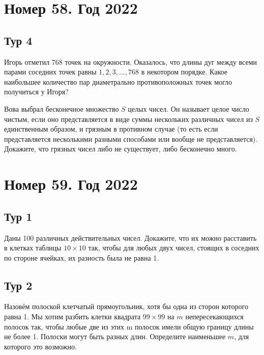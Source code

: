\documentclass[11pt, a4paper]{problems_template}
\begin{document}
\chapter{Номер 58. Год 2022}

\section{Тур 4}

\begin{exercise}
Игорь отметил 768 точек на окружности. Оказалось, что длины дуг между
всеми парами соседних точек равны $1, 2, 3, \dots, 768$ в некотором порядке. Какое наибольшее количество пар диаметрально противоположных точек могло получиться у Игоря?
\end{exercise}

\begin{exercise}
Вова выбрал бесконечное множество $S$ целых чисел. Он называет целое число чистым, если оно представляется в виде суммы нескольких различных чисел из $S$ единственным образом, и грязным в противном случае (то есть если представляется несколькими разными способами или вообще не представляется). Докажите, что грязных чисел либо не существует, либо бесконечно много.
\end{exercise}


\chapter{Номер 59. Год 2022}

\section{Тур 1}

\begin{exercise}
Даны 100 различных действительных чисел. Докажите, что их можно расставить в клетках таблицы $10 \times 10$ так, чтобы для любых двух чисел, стоящих в соседних по стороне ячейках, их разность была не равна 1.
\end{exercise}

\section{Тур 2}

\begin{exercise}
Назовём полоской клетчатый прямоугольник, хотя бы одна из сторон которого
равна 1. Мы хотим разбить клетки квадрата $99 \times 99$ на $m$ непересекающихся полосок так, чтобы любые две из этих m полосок имели общую границу длины не более 1. Полоски могут быть разных длин. Определите наименьшее $m$, для которого это возможно.
\end{exercise}
\end{document}
